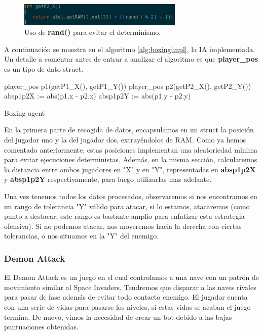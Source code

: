 \begin{figure}[h]
	\centering
	\includegraphics[width=0.7\textwidth]{Figures/BoxingAleatoriedad}
	\caption{Uso de \textbf{rand()} para evitar el determinismo.}
	\label{fig:boxingAleatoriedad}
\end{figure}

A continuación se muestra en el algoritmo \ref{alg:boxingimpl}, la IA implementada. Un detalle a comentar antes de entrar a analizar el algoritmo es que \textbf{player\_pos} es un tipo de dato struct.

\begin{algorithm}[H]
	player\_pos p1(getP1\_X(), getP1\_Y())\;
	player\_pos p2(getP2\_X(), getP2\_Y())\;
	absp1p2X := abs(p1.x - p2.x)\;
	absp1p2Y := abs(p1.y - p2.y)\;
	
	\caption{Boxing agent}
	\label{alg:boxingimpl}
\end{algorithm}

En la primera parte de recogida de datos, encapsulamos en un struct la posición del jugador uno y la del jugador dos, extrayéndolos de RAM. Como ya hemos comentado anteriormente, estas posiciones implementan una aleatoriedad mínima para evitar ejecuciones deterministas. Además, en la misma sección, calcularemos la distancia entre ambos jugadores en "X" y en "Y", representadas en \textbf{absp1p2X} y \textbf{absp1p2Y} respectivamente, para luego utilizarlas mas adelante.

Una vez tenemos todos los datos procesados, observaremos si nos encontramos en un rango de tolerancia "Y" válido para atacar, si lo estamos, atacaremos (como punto a destacar, este rango es bastante amplio para enfatizar esta estrategia ofensiva). Si no podemos atacar, nos moveremos hacia la derecha  con ciertas tolerancias, o nos situamos en la "Y" del enemigo.


\subsubsection{Demon Attack}
\label{subsec:botsbasicos:da}
El Demon Attack es un juego en el cual controlamos a una nave con un patrón de movimiento similar al Space Invaders. Tendremos que disparar a las naves rivales para pasar de fase además de evitar todo contacto enemigo. El jugador cuenta con una serie de vidas para pasarse los niveles, si estas vidas se acaban el juego termina. De nuevo, vimos la necesidad de crear un bot debido a las bajas puntuaciones obtenidas.

